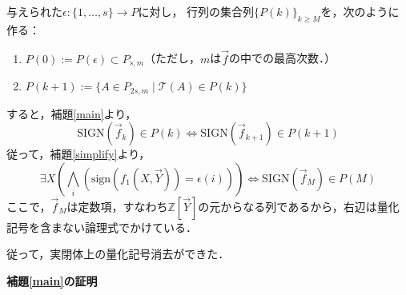 \documentclass[uplatex, dvipdfmx]{jsarticle}
\makeatletter
\renewenvironment{proof}[1][\proofname]{\par
  \pushQED{\qed}%
  \normalfont \topsep6\p@\@plus6\p@\relax
  \trivlist
  \item\relax
  {\bfseries
  #1\@addpunct{.}}\hspace\labelsep\ignorespaces
}{%
  \popQED\endtrivlist\@endpefalse
}
\newcommand{\sign}{\mathrm{sign}}
\newcommand{\SIGN}{\mathrm{SIGN}}
\newcommand{\Z}{\mathbb{Z}}
\newcommand{\map}[3]{{#1}:{#2}\rightarrow{#3}}
\theoremstyle{definition}
\renewcommand{\proofname}{\textbf{証明}}
\makeatother
\begin{document}
与えられた$\map{\epsilon}{\{1,\dots,s\}}{P}$に対し，
行列の集合列$\{P(k)\}_{k \geq M}$を，次のように作る：
\begin{enumerate}
    \item $P(0):= P(\epsilon) \subset P_{s,m}$（ただし，$m$は$\vec{f}$の中での最高次数．）
    \item $P(k+1):=\{A \in P_{2s,m} \mid \mathcal{T}(A) \in P(k)\}$
\end{enumerate}

すると，補題\ref{main}より，
\[
    \SIGN(\vec{f}_k) \in P(k) \iff \SIGN(\vec{f}_{k+1}) \in P(k+1)
\]
従って，補題\ref{simplify}より，
\[
    \exists X (\bigwedge_i(\sign(f_1(X,\vec{Y}))=\epsilon(i))) \iff \SIGN(\vec{f}_M) \in P(M)
\]
ここで，$\vec{f}_M$は定数項，すなわち$\Z[\vec{Y}]$の元からなる列であるから，右辺は量化記号を含まない論理式でかけている．

従って，実閉体上の量化記号消去ができた．

\begin{proof}[補題\ref{main}の証明]
    
\end{proof}
\end{document}
